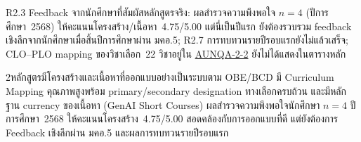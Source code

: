 \begin{weaknessbox}
R2.3 Feedback จากนักศึกษาที่สัมผัสหลักสูตรจริง: ผลสำรวจความพึงพอใจ $n=4$ (ปีการศึกษา~2568) ให้คะแนนโครงสร้าง/เนื้อหา~4.75/5.00 แต่นี่เป็นปีแรก ยังต้องรวบรวม feedback เชิงลึกจากนักศึกษาเมื่อสิ้นปีการศึกษาผ่าน มคอ.5; R2.7 การทบทวนรายปีรอบแรกยังไม่แล้วเสร็จ; CLO--PLO mapping ของวิชาเลือก~22 วิชาอยู่ใน \hyperlink{ref:AUNQA-2-2}{AUNQA-2-2} ยังไม่ได้แสดงในตารางหลัก
\end{weaknessbox}

\begin{selfassessmentbox}{2}{หลักสูตรมีโครงสร้างและเนื้อหาที่ออกแบบอย่างเป็นระบบตาม OBE/BCD มี Curriculum Mapping คุณภาพสูงพร้อม primary/secondary designation ทางเลือกครบถ้วน และมีหลักฐาน currency ของเนื้อหา (GenAI Short Courses) ผลสำรวจความพึงพอใจนักศึกษา $n=4$ ปีการศึกษา~2568 ให้คะแนนโครงสร้าง~4.75/5.00 สอดคล้องกับการออกแบบที่ดี แต่ยังต้องการ Feedback เชิงลึกผ่าน มคอ.5 และผลการทบทวนรายปีรอบแรก}
\end{selfassessmentbox}

